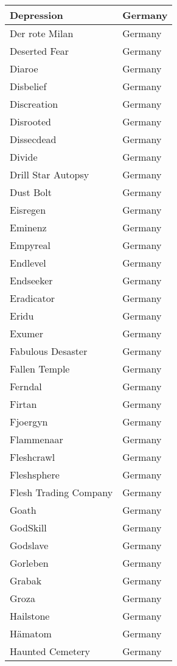 \documentclass[12pt, a4paper, twoside]{report}
\begin{document}
\begin{center}
\begin{longtable}{|p{5cm}|p{5cm}|}
Depression & Germany \\ \hline
Der rote Milan & Germany \\ \hline
Deserted Fear & Germany \\ \hline
Diaroe & Germany \\ \hline
Disbelief & Germany \\ \hline
Discreation & Germany \\ \hline
Disrooted & Germany \\ \hline
Dissecdead & Germany \\ \hline
Divide & Germany \\ \hline
Drill Star Autopsy & Germany \\ \hline
Dust Bolt & Germany \\ \hline
Eisregen & Germany \\ \hline
Eminenz & Germany \\ \hline
Empyreal & Germany \\ \hline
Endlevel & Germany \\ \hline
Endseeker & Germany \\ \hline
Eradicator & Germany \\ \hline
Eridu & Germany \\ \hline
Exumer & Germany \\ \hline
Fabulous Desaster & Germany \\ \hline
Fallen Temple & Germany \\ \hline
Ferndal & Germany \\ \hline
Firtan & Germany \\ \hline
Fjoergyn & Germany \\ \hline
Flammenaar & Germany \\ \hline
Fleshcrawl & Germany \\ \hline
Fleshsphere & Germany \\ \hline
Flesh Trading Company & Germany \\ \hline
Goath & Germany \\ \hline
GodSkill & Germany \\ \hline
Godslave & Germany \\ \hline
Gorleben & Germany \\ \hline
Grabak & Germany \\ \hline
Groza & Germany \\ \hline
Hailstone & Germany \\ \hline
Hämatom & Germany \\ \hline
Haunted Cemetery & Germany \\ \hline

\end{longtable}
\end{center}
\end{document}
